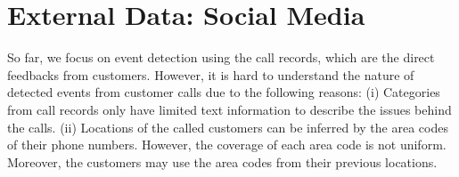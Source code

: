 





\section{External Data: Social Media}
\label{sec:twitter}

So far, we focus on event detection using the call records,
which are the direct feedbacks from customers.
However, it is hard to understand the nature of detected events from customer calls
due to the following reasons:
(i) Categories from call records only have limited text
information to describe the issues behind the calls.
(ii) Locations of the called customers can be inferred by the area codes of their phone numbers.
However, the coverage of each area code is not uniform.
Moreover, the customers may use the area codes from their previous locations.


